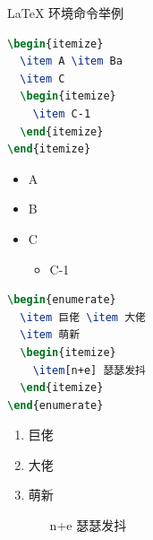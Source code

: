 \documentclass{beamer}
\begin{document}
\begin{frame}[fragile]{\LaTeX{} 环境命令举例}
	\begin{minipage}{0.7\linewidth}
		\begin{lstlisting}[language=TeX]
\begin{itemize}
  \item A \item Ba
  \item C
  \begin{itemize}
    \item C-1
  \end{itemize}
\end{itemize}
\end{lstlisting}
	\end{minipage}\hspace{1cm}
	\begin{minipage}{0.3\linewidth}
		\begin{itemize}
			\item A
			\item B
			\item C
			      \begin{itemize}
				      \item C-1
			      \end{itemize}
		\end{itemize}
	\end{minipage}
	\medskip
	\pause
	\begin{minipage}{0.5\linewidth}
		\begin{lstlisting}[language=TeX]
\begin{enumerate}
  \item 巨佬 \item 大佬
  \item 萌新
  \begin{itemize}
    \item[n+e] 瑟瑟发抖
  \end{itemize}
\end{enumerate}
\end{lstlisting}
	\end{minipage}\hspace{1cm}
	\begin{minipage}{0.3\linewidth}
		\begin{enumerate}
			\item 巨佬
			\item 大佬
			\item 萌新
			      \begin{itemize}
				      \item[n+e] 瑟瑟发抖
			      \end{itemize}
		\end{enumerate}
	\end{minipage}
\end{frame}
\end{document}

